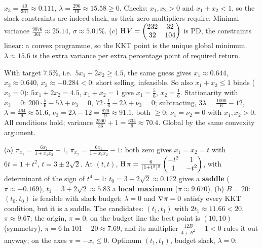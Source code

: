 \begin{solutions}
        $x_3=\tfrac{40}{361}\approx0.111$, $\lambda=\tfrac{296}{19}\approx15.58\ge0$.
        Checks: $x_1,x_2>0$ and $x_1+x_2<1$, so the slack constraints are
        indeed slack, as their zero multipliers require. Minimal variance
        $\tfrac{9076}{361}\approx25.14$, $\sigma\approx5.01\%$.
        (c) $\operatorname{H} V=\begin{pmatrix}232&32\\32&104\end{pmatrix}$ is PD, the
        constraints linear: a convex programme, so the KKT point is the
        unique global minimum. $\lambda\approx15.6$ is the extra variance per
        extra percentage point of required return.
  \item With target $7.5\%$, i.e.\ $5x_1+2x_2\ge4.5$, the same guess gives
        $x_1\approx0.644$, $x_2\approx0.640$, $x_3\approx-0.284<0$: short
        selling, infeasible. So also $x_1+x_2\le1$ binds ($x_3=0$):
        $5x_1+2x_2=4.5$, $x_1+x_2=1$ give $x_1=\tfrac56$, $x_2=\tfrac16$.
        Stationarity with $x_3=0$: $200\cdot\tfrac56-5\lambda+\nu_3=0$,
        $72\cdot\tfrac16-2\lambda+\nu_3=0$; subtracting,
        $3\lambda=\tfrac{1000}{6}-12$, $\lambda=\tfrac{464}9\approx51.6$,
        $\nu_3=2\lambda-12=\tfrac{820}9\approx91.1$, both $\ge0$; $\nu_1=\nu_2=0$
        with $x_1,x_2>0$. All conditions hold; variance
        $\tfrac{2500}{36}+1=\tfrac{634}9\approx70.4$. Global by the same
        convexity argument.
  \item (a) $\pi_{x_1}=\tfrac{6x_2}{1+x_1x_2}-1$,
        $\pi_{x_2}=\tfrac{6x_1}{1+x_1x_2}-1$: both zero gives $x_1=x_2=t$
        with $6t=1+t^{2}$, $t=3\pm2\sqrt2$. At $(t,t)$,
        $\operatorname{H}\pi=\tfrac{6}{(1+t^{2})^{2}}\begin{pmatrix}-t^{2}&1\\1&-t^{2}\end{pmatrix}$,
        with determinant of the sign of $t^{4}-1$: $t_0=3-2\sqrt2\approx0.172$
        gives a \textbf{saddle} ($\pi\approx-0.169$), $t_1=3+2\sqrt2\approx5.83$
        a \textbf{local maximum} ($\pi\approx9.670$).
        (b) $B=20$: $(t_0,t_0)$ is feasible with slack budget; $\lambda=0$
        and $\nabla\pi=0$ satisfy every KKT condition, but it is a saddle. The
        candidates: $(t_1,t_1)$ with $2t_1\approx11.66<20$, $\pi\approx9.67$;
        the origin, $\pi=0$; on the budget line the best point is
        $(10,10)$ (symmetry), $\pi=6\ln101-20\approx7.69$, and its multiplier
        $\tfrac{12B}{4+B^{2}}-1<0$ rules it out anyway; on the axes
        $\pi=-x_i\le0$. Optimum $(t_1,t_1)$, budget slack, $\lambda=0$:

\end{solutions}
